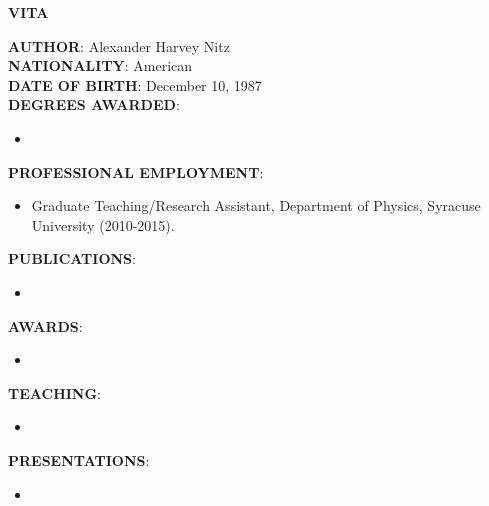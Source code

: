 \thispagestyle{empty}
\begin{center}
{\large {\bf VITA}}
\end{center}
\vspace{1cm}
{\bf AUTHOR}: Alexander Harvey Nitz \\
{\bf NATIONALITY}: American \\
{\bf DATE OF BIRTH}: December 10, 1987 \\
{\bf DEGREES AWARDED}:
\begin{itemize}
\item
\end{itemize}
{\bf PROFESSIONAL EMPLOYMENT}:
\begin{itemize}
\item[] Graduate Teaching/Research Assistant, Department of Physics, Syracuse University (2010-2015).
\end{itemize}
{\bf PUBLICATIONS}:
\begin{itemize}
\item
\end{itemize}
{\bf AWARDS}:
\begin{itemize}
\item
\end{itemize}
{\bf TEACHING}:
\begin{itemize}
\item
\end{itemize}
{\bf PRESENTATIONS}:
\begin{itemize}
\item
\end{itemize}

